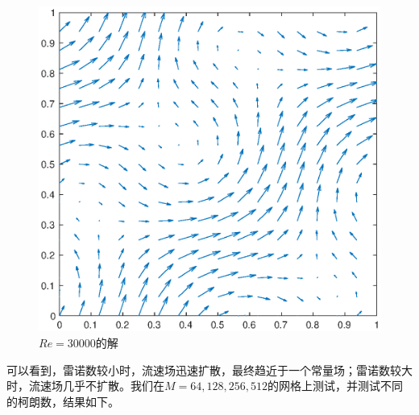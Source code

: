 \documentclass[lang=cn,10pt,bibend=bibtex]{elegantbook}
\begin{document}
\begin{figure}[H]
\begin{minipage}[c]{0.49\linewidth}
\begin{minipage}[t]{0.49\linewidth}
      \includegraphics[width=0.95\linewidth]{figure/test3_Re=30000.eps}
      \caption*{$Re=30000$的解}
    \end{minipage}
\end{minipage}
\end{figure}
\vspace{-1em}

可以看到，雷诺数较小时，流速场迅速扩散，最终趋近于一个常量场；雷诺数较大时，流速场几乎不扩散。我们在$M=64,128,256,512$的网格上测试，并测试不同的柯朗数，结果如下。
\end{document}
